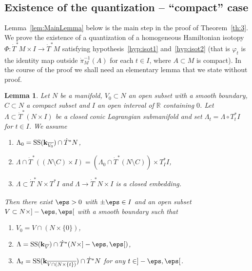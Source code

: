 \documentclass[12pt,leqno]{article}
\newtheorem{lemma}[theorem]{Lemma}
\theoremstyle{definition}
\newcommand{\R}{{\mathbb{R}}}
\def\phi{{\varphi}}
\newcommand{\cor}{{\bf k}}
\renewcommand{\to}[1][]{\xrightarrow[]{#1}}
\newcommand{\conv}[1][]{\mathop{\circ}\limits_{#1}}
\newcommand{\opb}[1]{#1^{-1}}
\newcommand{\cl}{\colon}
\newcommand{\bnum}{\begin{enumerate}[{\rm(i)}]}
\newcommand{\enum}{\end{enumerate}}
\newcommand{\banum}{\begin{enumerate}[{\rm(a)}]}
\newcommand{\eanum}{\end{enumerate}}
\newcommand{\SSi}{\mathrm{SS}}
\newcommand{\dT}{{\dot{T}}}
\newcommand{\dTM}{{\dT}^*M}
\numberwithin{equation}{section}
\begin{document}
\subsection{Existence of the quantization -- ``compact'' case}
Lemma~\ref{lem:MainLemma} below is the main step in the proof of
Theorem~\ref{th:3}.
We prove the existence of a quantization of 
a homogeneous Hamiltonian isotopy
$\Phi\cl \dTM\times I\to \dTM$ satisfying hypothesis~\eqref{hyp:isot1}
and~\eqref{hyp:isot2} (that is $\phi_t$ is the identity map outside
$\opb{\dot\pi_M}(A)$ for each $t\in I$, where $A\subset M$ is compact).
In the course of the proof we shall need an elementary lemma that we state
without proof.
\begin{lemma}\label{le:def_conormal}
Let $N$ be a manifold, $V_0\subset N$ an open subset with 
a smooth boundary, 
$C\subset N$ a compact subset and $I$ an open interval of $\R$
containing $0$.  Let $\Lambda \subset \dT^*(N\times I)$ be a closed
conic Lagrangian submanifold and  set $\Lambda_t = \Lambda \conv T^*_tI$ for
$t\in I$. We assume
\banum
\item $\Lambda_0 = \SSi(\cor_{\overline{V_0}})\cap \dT^*N$,
\item $\Lambda \cap \dT^*((N\setminus C) \times I)
 = (\Lambda_0 \cap \dT^*(N\setminus C)) \times T^*_II$,
\item $\Lambda\subset\dT^*N\times T^*I$ and 
$\Lambda\to\dT^*N\times I$ is a closed embedding.
\eanum
Then there exist $\eps>0$ with $\pm\eps\in I$ 
and an open subset $V \subset N\times ]-\eps,\eps[$
with a smooth boundary such that
\bnum
\item $V_0 = V \cap (N\times \{0\})$,
\item
$\Lambda = \SSi(\cor_{\overline V})\cap \dT^*(N\times ]-\eps,\eps[) $,
\item
$\Lambda_t = \SSi(\cor_{\overline{V \cap (N\times \{t\})}})\cap \dT^*N$
for any $t\in ]-\eps,\eps[$.
\enum
\end{lemma}
\end{document}
